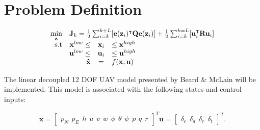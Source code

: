 \section{Problem Definition}

\begin{equation}
	\begin{array}{rrclcl}
		\displaystyle \min_{\mathbf{z}} & \multicolumn{3}{l}{\mathbf{J}_k = \frac{1}{2} \sum_{i=k}^{k+L} [\mathbf{e}(\mathbf{z}_i)^\intercal \mathbf{Q}\mathbf{e}(\mathbf{z}_i)] + \frac{1}{2}\sum_{i=k}^{k=L}[\mathbf{u}_i^\intercal \mathbf{R}\mathbf{u}_i]}\\
		\textrm{s.t}
		& \mathbf{x}^{low} \leq & \mathbf{x}_i & \leq \mathbf{x}^{high} \\
		& \mathbf{u}^{low} \leq & \mathbf{u}_i & \leq \mathbf{u}^{high} \\
		& \displaystyle \mathbf{\dot{x}} & = & f(\mathbf{x},\mathbf{u})
	\end{array}
\end{equation}

The linear decoupled 12 DOF UAV model presented by Beard \& McLain \cite{uavBEARD} will be implemented. This model is associated with the following states and control inputs:

\begin{subequations}
\begin{equation}
	\mathbf{x} =
	\begin{bmatrix}
		p_N \hspace{5pt} p_E \hspace{5pt} h \hspace{5pt}
		u \hspace{5pt} v \hspace{5pt} w \hspace{5pt}
		\phi \hspace{5pt} \theta \hspace{5pt} \psi \hspace{5pt}
		p \hspace{5pt} q \hspace{5pt} r
	\end{bmatrix}^T
\end{equation}
\begin{equation}
	\mathbf{u} =
	\begin{bmatrix}
		\delta_e \hspace{5pt} \delta_a \hspace{5pt} \delta_r \hspace{5pt} \delta_t
	\end{bmatrix}^T.
\end{equation}
\end{subequations}


